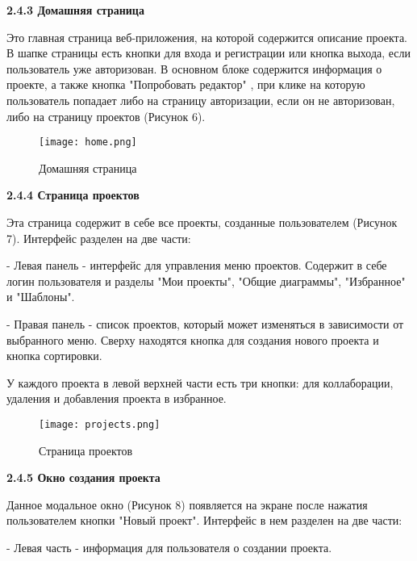 \textbf{\large 2.4.3 Домашняя страница}

Это главная страница веб-приложения, на которой содержится описание проекта.
В шапке страницы есть кнопки для входа и регистрации или кнопка выхода, если пользователь уже авторизован. В основном блоке содержится информация о проекте, а также кнопка "Попробовать редактор" , при клике на которую пользователь попадает либо на страницу авторизации, если он не авторизован, либо на страницу проектов (Рисунок 6).

\renewcommand{\figurename}{Рисунок}
\begin{figure}[htbp]
    \centering %
    \texttt{[image: home.png]}
    \caption{Домашняя страница}
    \label{fig:analyze} %
\end{figure}

\textbf{\large 2.4.4 Страница проектов}

Эта страница содержит в себе все проекты, созданные пользователем (Рисунок 7). Интерфейс разделен на две части:

    - Левая панель - интерфейс для управления меню проектов. Содержит в себе логин пользователя и разделы "Мои проекты", "Общие диаграммы", "Избранное" и "Шаблоны".
    
    - Правая панель - список проектов, который может изменяться в зависимости от выбранного меню. Сверху находятся кнопка для создания нового проекта и кнопка сортировки.

У каждого проекта в левой верхней части есть три кнопки: для коллаборации, удаления и добавления проекта в избранное.

\renewcommand{\figurename}{Рисунок}
\begin{figure}[htbp]
    \centering %
    \texttt{[image: projects.png]}
    \caption{Страница проектов}
    \label{fig:analyze} %
\end{figure}

\newpage

\textbf{\large 2.4.5 Окно создания проекта}

Данное модальное окно (Рисунок 8) появляется на экране после нажатия пользователем кнопки "Новый проект". Интерфейс в нем разделен на две части:

    - Левая часть - информация для пользователя о создании проекта.
    
